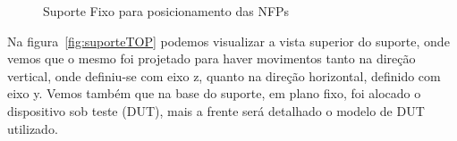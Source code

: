 \begin{figure}[htb!]
	\centering
 	\caption{Suporte Fixo para posicionamento das NFPs}
\end{figure}

Na figura~\ref{fig:suporteTOP} podemos visualizar a vista superior do suporte, onde vemos que o mesmo foi projetado para haver movimentos tanto na direção vertical, onde definiu-se com eixo z, quanto na direção horizontal, definido com eixo y. Vemos também que na base do suporte, em plano fixo, foi alocado o dispositivo sob teste (DUT), mais a frente será detalhado o modelo de DUT utilizado.

